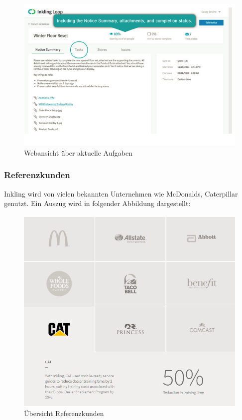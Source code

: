 \begin{figure}[H] 
\centering 
\includegraphics[scale=0.72]{images/inkweb} 
\caption[Webansicht über aktuelle Aufgaben]{Webansicht über aktuelle Aufgaben\protect} 
\label{ws} 
\end{figure}

\subsubsection{Referenzkunden}

Inkling wird von vielen bekannten Unternehmen wie McDonalds, Caterpillar genutzt. Ein Auszug wird in folgender Abbildung dargestellt:

\begin{figure}[H] 
\centering 
\includegraphics[scale=0.72]{images/inkcustomers} 
\caption[Übersicht Referenzkunden]{Übersicht Referenzkunden\protect} 
\label{ws} 
\end{figure}

